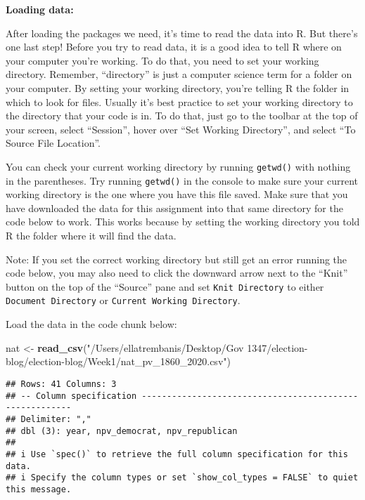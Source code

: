 \documentclass[
]{article}
\newenvironment{Shaded}{\begin{snugshade}}{\end{snugshade}}
\newcommand{\FunctionTok}[1]{\textcolor[rgb]{0.13,0.29,0.53}{\textbf{#1}}}
\newcommand{\NormalTok}[1]{#1}
\newcommand{\OtherTok}[1]{\textcolor[rgb]{0.56,0.35,0.01}{#1}}
\newcommand{\StringTok}[1]{\textcolor[rgb]{0.31,0.60,0.02}{#1}}
\begin{document}
\textbf{Loading data:}

After loading the packages we need, it's time to read the data into R.
But there's one last step! Before you try to read data, it is a good
idea to tell R where on your computer you're working. To do that, you
need to set your working directory. Remember, ``directory'' is just a
computer science term for a folder on your computer. By setting your
working directory, you're telling R the folder in which to look for
files. Usually it's best practice to set your working directory to the
directory that your code is in. To do that, just go to the toolbar at
the top of your screen, select ``Session'', hover over ``Set Working
Directory'', and select ``To Source File Location''.

You can check your current working directory by running \texttt{getwd()}
with nothing in the parentheses. Try running \texttt{getwd()} in the
console to make sure your current working directory is the one where you
have this file saved. Make sure that you have downloaded the data for
this assignment into that same directory for the code below to work.
This works because by setting the working directory you told R the
folder where it will find the data.

Note: If you set the correct working directory but still get an error
running the code below, you may also need to click the downward arrow
next to the ``Knit'' button on the top of the ``Source'' pane and set
\texttt{Knit\ Directory} to either \texttt{Document\ Directory} or
\texttt{Current\ Working\ Directory}.

Load the data in the code chunk below:

\begin{Shaded}
\begin{Highlighting}[]
\NormalTok{nat }\OtherTok{\textless{}{-}} \FunctionTok{read\_csv}\NormalTok{(}\StringTok{"/Users/ellatrembanis/Desktop/Gov 1347/election{-}blog/election{-}blog/Week1/nat\_pv\_1860\_2020.csv"}\NormalTok{)}
\end{Highlighting}
\end{Shaded}

\begin{verbatim}
## Rows: 41 Columns: 3
## -- Column specification --------------------------------------------------------
## Delimiter: ","
## dbl (3): year, npv_democrat, npv_republican
## 
## i Use `spec()` to retrieve the full column specification for this data.
## i Specify the column types or set `show_col_types = FALSE` to quiet this message.
\end{verbatim}
\end{document}
